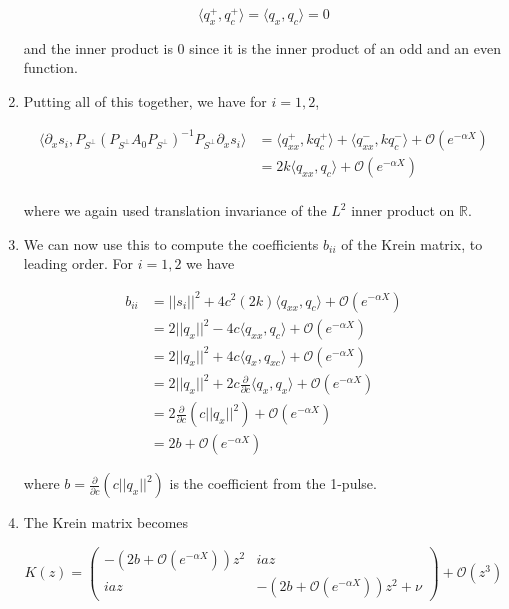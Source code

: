 \documentclass[12pt]{article}
\def\R{{\mathbb R}}
\begin{document}
\begin{enumerate}
\[
\langle q^+_x, q^+_c \rangle = \langle q_x, q_c \rangle = 0
\]

and the inner product is 0 since it is the inner product of an odd and an even function.

\item Putting all of this together, we have for $i = 1, 2$,

\begin{align*}
\langle \partial_x s_i, P_{S^\perp} (P_{S^\perp} A_0 P_{S^\perp})^{-1} P_{S^\perp} \partial_x s_i \rangle
&= \langle q^+_{xx}, k q^+_c \rangle + 
\langle q^-_{xx}, k q^-_c \rangle 
+ \mathcal{O}(e^{-\alpha X}) \\
&= 2 k \langle q_{xx}, q_c \rangle 
+ \mathcal{O}(e^{-\alpha X}) \\
\end{align*}

where we again used translation invariance of the $L^2$ inner product on $\R$.

\item We can now use this to compute the coefficients $b_{ii}$ of the Krein matrix, to leading order. For $i = 1, 2$ we have

\begin{align*}
b_{ii} &= ||s_i||^2 + 4 c^2 (2 k) \langle q_{xx}, q_c \rangle + \mathcal{O}(e^{-\alpha X}) \\
&= 2 ||q_x||^2 - 4 c \langle q_{xx}, q_c \rangle + \mathcal{O}(e^{-\alpha X}) \\
&= 2 ||q_x||^2 + 4 c \langle q_x, q_{xc} \rangle + \mathcal{O}(e^{-\alpha X}) \\
&= 2 ||q_x||^2 + 2 c \frac{\partial}{\partial c} \langle q_x, q_x \rangle + \mathcal{O}(e^{-\alpha X}) \\
&= 2 \frac{\partial}{\partial c}\left( c ||q_x||^2 \right) + \mathcal{O}(e^{-\alpha X}) \\
&= 2 b + \mathcal{O}(e^{-\alpha X})
\end{align*}

where $b = \frac{\partial}{\partial c}\left( c ||q_x||^2 \right)$ is the coefficient from the 1-pulse.\\

\item The Krein matrix becomes

\begin{equation}
K(z) = \begin{pmatrix}
-(2 b + \mathcal{O}(e^{-\alpha X})) z^2 & i a z \\
i a z & -(2 b + \mathcal{O}(e^{-\alpha X})) z^2 + \nu
\end{pmatrix}
+ \mathcal{O}(z^3)
\end{equation}


\end{enumerate}
\end{document}
